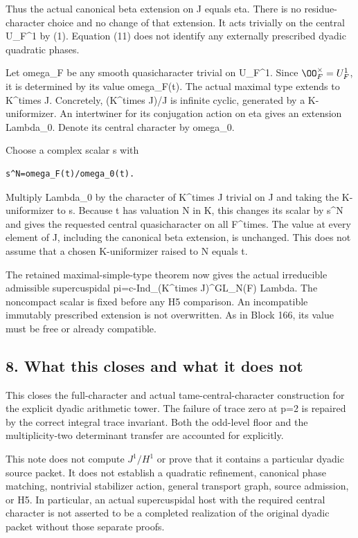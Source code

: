 Thus the actual canonical beta extension on J equals eta. There is no
residue-character choice and no change of that extension. It acts
trivially on the central U\_F\^{}1 by (1). Equation (11) does not
identify any externally prescribed dyadic quadratic phases.

Let omega\_F be any smooth quasicharacter trivial on U\_F\^{}1. Since
\(\OO_F^\times=U_F^1\), it is determined by its value
omega\_F(t). The actual maximal type extends to K\^{}times J.
Concretely, (K\^{}times J)/J is infinite cyclic, generated by a
K-uniformizer. An intertwiner for its conjugation action on eta gives an
extension Lambda\_0. Denote its central character by omega\_0.

Choose a complex scalar s with

\begin{Verbatim}[fontsize=\small,breaklines=true,breakanywhere=true]
s^N=omega_F(t)/omega_0(t).
\end{Verbatim}

Multiply Lambda\_0 by the character of K\^{}times J trivial on J and
taking the K-uniformizer to s. Because t has valuation N in K, this
changes its scalar by s\^{}N and gives the requested central
quasicharacter on all F\^{}times. The value at every element of J,
including the canonical beta extension, is unchanged. This does not
assume that a chosen K-uniformizer raised to N equals t.

The retained maximal-simple-type theorem now gives the actual
irreducible admissible supercuspidal pi=c-Ind\_(K\^{}times
J)\^{}GL\_N(F) Lambda. The noncompact scalar is fixed before any H5
comparison. An incompatible immutably prescribed extension is not overwritten. As in Block 166, its value must be free or already compatible.

\hypertarget{dyadic_character-what-this-closes-and-what-it-does-not}{%
\subsection{8. What this closes and what it does
not}\label{dyadic_character-what-this-closes-and-what-it-does-not}}

This closes the full-character and actual tame-central-character
construction for the explicit dyadic arithmetic tower. The failure of
trace zero at p=2 is repaired by the correct integral trace invariant.
Both the odd-level floor and the multiplicity-two determinant transfer
are accounted for explicitly.

This note does not compute \(J^1/H^1\) or prove that it
contains a particular dyadic source packet. It does not establish a
quadratic refinement, canonical phase matching, nontrivial stabilizer
action, general transport graph, source admission, or H5. In particular,
an actual supercuspidal host with the required central character is not
asserted to be a completed realization of the original dyadic packet
without those separate proofs.

